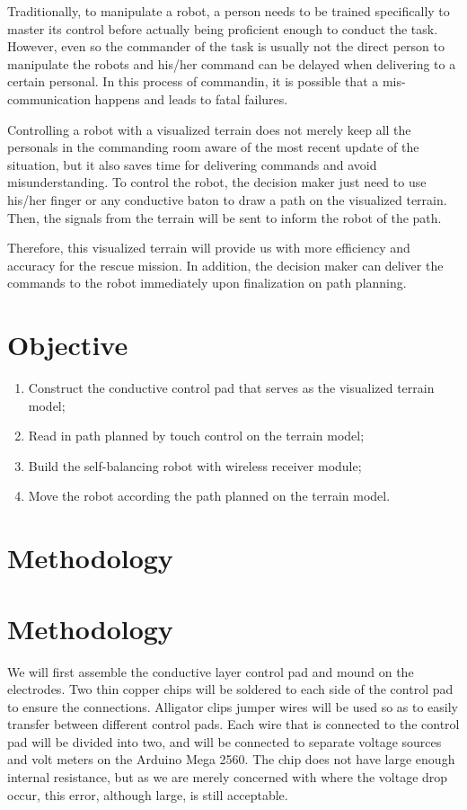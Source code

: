 \documentclass[a4paper,12pt]{article}
\begin{document}
Traditionally, to manipulate a robot, a person needs to be trained specifically to master its control before actually being proficient enough to conduct the task. However, even so the commander of the task is usually not the direct person to manipulate the robots and his/her command can be delayed when delivering to a certain personal. In this process of commandin, it is possible that a mis-communication happens and leads to fatal failures.

Controlling a robot with a visualized terrain does not merely keep all the personals in the commanding room aware of the most recent update of the situation, but it also saves time for delivering commands and avoid misunderstanding. To control the robot, the decision maker just need to use his/her finger or any conductive baton to draw a path on the visualized terrain. Then, the signals from the terrain will be sent to inform the robot of the path. 

Therefore, this visualized terrain will provide us with more efficiency and accuracy for the rescue mission. In addition, the decision maker can deliver the commands to the robot immediately upon finalization on path planning.

\section{Objective}

\begin{enumerate}
	\item Construct the conductive control pad that serves as the visualized terrain model;
	\item Read in path planned by touch control on the terrain model; 
	\item Build the self-balancing robot with wireless receiver module;
	\item Move the robot according the path planned on the terrain model.
\end{enumerate}


\section{Methodology}
\section{Methodology}
We will first assemble the conductive layer control pad and mound on the electrodes. Two thin copper chips will be soldered to each side of the control pad to ensure the connections. Alligator clips jumper wires will be used so as to easily transfer between different control pads. Each wire that is connected to the control pad will be divided into two, and will be connected to separate voltage sources and volt meters on the Arduino Mega 2560. The chip does not have large enough internal resistance, but as we are merely concerned with where the voltage drop occur, this error, although large, is still acceptable.
\end{document}
